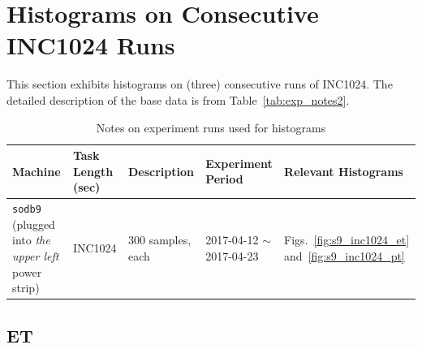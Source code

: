 \clearpage

\section{Histograms on Consecutive INC1024 Runs~\label{sec:s9_1024_runs}} 
This section exhibits histograms on (three) consecutive runs of INC1024. 
The detailed description of the base data is from Table~\ref{tab:exp_notes2}.

\begin{table}[h]
\begin{center}
\begin{tabular}{|p{2cm}|p{3cm}|p{3cm}|p{4cm}|p{3.5cm}|} \hline
Machine & Task Length (sec) & Description & Experiment Period & Relevant \linebreak Histograms\\ \hline
{\tt sodb9} (plugged into {\em the upper left} power strip) &  INC1024 & 300 samples, each & 2017-04-12 $\sim$ 2017-04-23 & 
Figs.~\ref{fig:s9_inc1024_et} and~\ref{fig:s9_inc1024_pt}\\ \hline
\end{tabular}
\end{center}
\vspace{-.2in}
\caption{Notes on experiment runs used for histograms\label{tab:inc1024_run_notes}}
\end{table}


\subsection{ET}

